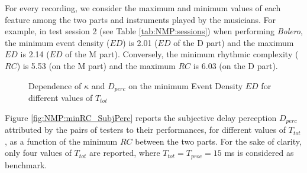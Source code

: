  

For every recording, we consider the maximum and minimum values of each feature among the two parts and instruments played by the musicians. For example, in test session 2 (see Table \ref{tab:NMP:sessions}) when performing \textit{Bolero}, the minimum event density ($ED$) is 2.01 ($ED$ of the D part) and the maximum $ED$ is 2.14 ($ED$ of the M part). Conversely, the minimum rhythmic complexity ($RC$) is 5.53 (on the M part) and the maximum $RC$ is 6.03 (on the D part).

\begin{figure}[!tb]
\begin{flushright}
    \hfil
\end{flushright}
\caption{Dependence of $\kappa$ and $D_{perc}$ on the minimum Event Density $ED$ for different values of $T_{tot}$}
\label{fig:NMP:minED}
\end{figure}

Figure \ref{fig:NMP:minRC_SubjPerc} reports the subjective delay perception $D_{perc}$ attributed by the pairs of testers to their performances, for different values of $T_{tot}$, as a function of the minimum $RC$ between the two parts. For the sake of clarity, only four values of $T_{tot}$ are reported, where $T_{tot}=T_{proc}=15$ ms is considered as benchmark. 

